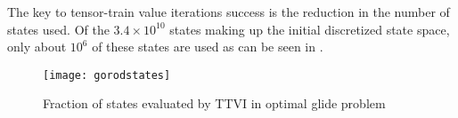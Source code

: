 The key to tensor-train value iterations success is the reduction in the number of states used. Of the $3.4 \times 10^{10}$ states making up the initial discretized state space, only about $10^6$ of these states are used as can be seen in  \cite{Gorod}.
\begin{figure}
\centering
\texttt{[image: gorodstates]}
\caption{Fraction of states evaluated by TTVI in optimal glide problem \cite{Gorod}}
\label{gorodstates}
\end{figure}